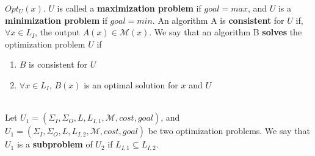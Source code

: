 \begin{tabu}
{   $Opt_U(x)$. $U$ is called a {\bf maximization problem} if $goal = max$,
   and $U$ is a {\bf minimization problem} if $goal = min$. \newline
   An algorithm A is {\bf consistent} for $U$ if, $\forall x \in L_I$, the
   output $A(x) \in \mathcal{M}(x)$. We say that an algorithm B {\bf solves} the
   optimization problem $U$ if
   \begin{enumerate} \itemsep1pt \parskip0pt  \vspace{-\medskipamount}
   \item $B$ is consistent for $U$
   \item $\forall x \in L_I$, $B(x)$ is an optimal solution for $x$ and $U$
   \vspace{-\medskipamount} \end{enumerate}} \\ \hline
 {Let $U_1 = (\Sigma_I, \Sigma_O, L, L_{I,1}, \mathcal{M}, cost,
 goal)$, and $ U_1 = (\Sigma_I, \Sigma_O, L, L_{I,2}, \mathcal{M}, cost, goal)$
 be two optimization problems. We say that $U_1$ is a {\bf subproblem} of $U_2$
 if $L_{I,1} \subseteq L_{I,2}$.}
\end{tabu}
